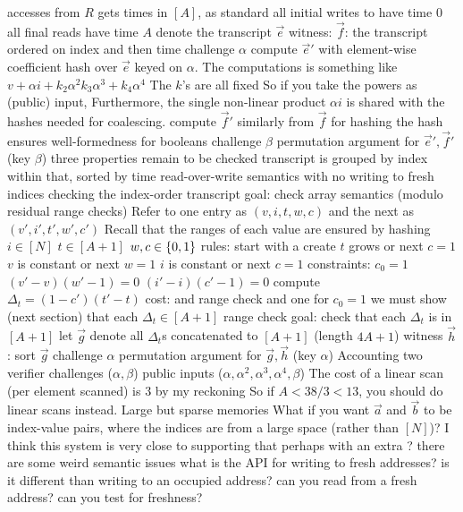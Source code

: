 \begin{outline}
      \3 accesses from $R$ gets times in $[A]$, as standard
      \3 all initial writes to have time 0
      \3 all final reads have time $A$
  \2 denote the transcript $\vec e$
  \2 witness: $\vec f$: the transcript ordered on index and then time
  \2 challenge $\alpha$
  \2 compute $\vec e'$ with element-wise coefficient hash over $\vec e$ keyed on $\alpha$.
    \3 The computations is something like $v + \alpha i + k_2 \alpha^2 k_3 \alpha^3 + k_4 \alpha^4$
    \3 The $k$'s are all fixed
    \3 So if you take the powers as (public) input,
    \3 
    \3 Furthermore, the single non-linear product $\alpha i$ is shared with the
    hashes needed for coalescing.
  \2 compute $\vec f'$ similarly from $\vec f$
    \3  for hashing
    \3 the hash ensures well-formedness for booleans
  \2 challenge $\beta$
  \2 permutation argument for $\vec e', \vec f'$ (key $\beta$)
    \3 
  \2 three properties remain to be checked
    \3 transcript is grouped by index
    \3 within that, sorted by time
    \3 read-over-write semantics
      \4 with no writing to fresh indices
\1 checking the index-order transcript
  \2 goal: check array semantics (modulo residual range checks)
  \2 Refer to one entry as $(v, i, t, w, c)$ and the next as $(v', i', t', w', c')$
  \2 Recall that the ranges of each value are ensured by hashing
    \3 $i \in [N]$
    \3 $t \in [A+1]$
    \3 $w, c \in \{0,1\}$
  \2 rules:
    \3 start with a create
    \3 $t$ grows or next $c=1$
    \3 $v$ is constant or next $w=1$
    \3 $i$ is constant or next $c=1$
  \2 constraints:
    \3 $c_0 = 1$
    \3 $(v'-v)(w'-1)=0$
    \3 $(i'-i)(c'-1)=0$
    \3 compute $\Delta_t = (1-c')(t'-t)$
    \3 cost: 
      \4 and range check
      \4 and one for $c_0 = 1$
    \3 we must show (next section) that each $\Delta_t \in [A+1]$
\1 range check
  \2 goal: check that each $\Delta_t$ is in $[A+1]$
  \2 let $\vec g$ denote all $\Delta_t$s concatenated to $[A+1]$ (length $4A+1$)
  \2 witness $\vec h$: sort $\vec g$
  \2 challenge $\alpha$
  \2 permutation argument for $\vec g, \vec h$ (key $\alpha$)
    \3 
\1 Accounting
  \2 two verifier challenges ($\alpha,\beta$)
    \3 public inputs ($\alpha,\alpha^2,\alpha^3,\alpha^4,\beta$)
  \2 
  \2 
    \3 The cost of a linear scan (per element scanned) is $3$ by my reckoning
    \3 So if $A < 38/3 < 13$, you should do linear scans instead.
\1 Large but sparse memories
  \2 What if you want $\vec a$ and $\vec b$ to be index-value pairs, where the
  indices are from a large space (rather than $[N]$)?
  \2 I think this system is very close to supporting that
    \3 perhaps with an extra ?
    \3 there are some weird semantic issues
      \4 what is the API for writing to fresh addresses?
      \4 is it different than writing to an occupied address?
      \4 can you read from a fresh address?
      \4 can you test for freshness?
\end{outline}

